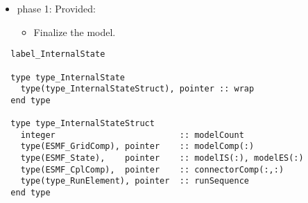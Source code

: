 \begin{itemize}
\item phase 1: {\sc Provided:}
  \begin{itemize}
  \item Finalize the model.
  \end{itemize}      
\end{itemize}

\begin{verbatim}  label_InternalState

  type type_InternalState
    type(type_InternalStateStruct), pointer :: wrap
  end type

  type type_InternalStateStruct
    integer                         :: modelCount
    type(ESMF_GridComp), pointer    :: modelComp(:)
    type(ESMF_State),    pointer    :: modelIS(:), modelES(:)
    type(ESMF_CplComp),  pointer    :: connectorComp(:,:)
    type(type_RunElement), pointer  :: runSequence
  end type

\end{verbatim}

